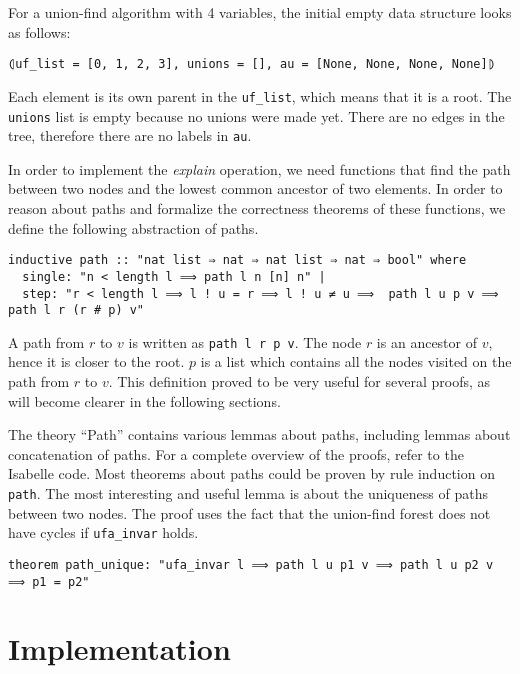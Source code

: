 \begin{exmp}\label{empty_ufe}
For a union-find algorithm with 4 variables, the initial empty data structure looks as follows:
\begin{lstlisting}
⦇uf_list = [0, 1, 2, 3], unions = [], au = [None, None, None, None]⦈
\end{lstlisting}
Each element is its own parent in the \lstinline{uf_list}, which means that it is a root. The \lstinline{unions} list is empty because no unions were made yet.
There are no edges in the tree, therefore there are no labels in \lstinline{au}.
\end{exmp}

In order to implement the \emph{explain} operation, we need functions that find the path between two nodes and the lowest common ancestor of two elements.
In order to reason about paths and formalize the correctness theorems of these functions, we define the following abstraction of paths.

\begin{lstlisting}
inductive path :: "nat list ⇒ nat ⇒ nat list ⇒ nat ⇒ bool" where
  single: "n < length l ⟹ path l n [n] n" |
  step: "r < length l ⟹ l ! u = r ⟹ l ! u ≠ u ⟹  path l u p v ⟹ path l r (r # p) v"
\end{lstlisting}

A path from $r$ to $v$ is written as \lstinline{path l r p v}. The node $r$ is an ancestor of $v$, hence it is closer to the root. $p$ is a list which contains all the nodes visited on the path from $r$ to $v$. This definition proved to be very useful for several proofs, as will become clearer in the following sections.

The theory ``Path'' contains various lemmas about paths, including lemmas about concatenation of paths.
For a complete overview of the proofs, refer to the Isabelle code.
Most theorems about paths could be proven by rule induction on \lstinline{path}.
The most interesting and useful lemma is about the uniqueness of paths between two nodes. The proof uses the fact that the union-find forest does not have cycles if \lstinline|ufa_invar| holds.

\begin{lstlisting}
theorem path_unique: "ufa_invar l ⟹ path l u p1 v ⟹ path l u p2 v ⟹ p1 = p2"
\end{lstlisting}


\section{Implementation}

